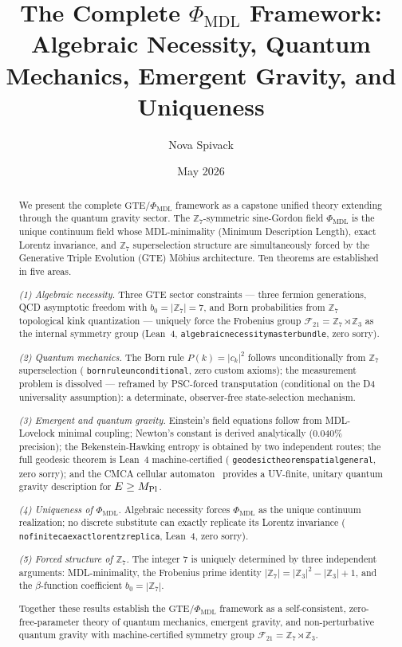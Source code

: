 \documentclass[11pt]{article}
\theoremstyle{remark}
\newcommand{\GTE}{\text{GTE}}
\newcommand{\PHIMDL}{\Phi_{\mathrm{MDL}}}
\newcommand{\ZS}{\mathbb{Z}_7}
\newcommand{\ZZ}{\mathbb{Z}}
\newcommand{\lean}[1]{%
  \penalty-100
  \begingroup\def\_{\textunderscore\allowbreak}\texttt{#1}\endgroup}
\newcommand{\FTT}{\mathcal{F}_{21}}
\begin{document}
\title{\textbf{The Complete $\PHIMDL$ Framework: Algebraic Necessity,
  Quantum Mechanics, Emergent Gravity, and Uniqueness}}

\author{Nova Spivack}
\date{May 2026}
\maketitle

\NovaZenodoAfterTitle

\begin{abstract}
We present the complete $\GTE$/$\PHIMDL$ framework as a capstone unified theory
extending through the quantum gravity sector.
The $\ZS$-symmetric sine-Gordon field $\PHIMDL$ is the unique continuum field whose
MDL-minimality (Minimum Description Length), exact Lorentz invariance, and $\ZS$
superselection structure are simultaneously forced by the Generative Triple
Evolution (GTE) Möbius architecture.  Ten theorems are established in five areas.

\textit{(1) Algebraic necessity.}
Three GTE sector constraints --- three fermion generations, QCD asymptotic freedom
with $b_0 = |\ZS| = 7$, and Born probabilities from $\ZS$ topological kink
quantization --- uniquely force the Frobenius group $\FTT = \ZS\rtimes\ZZ_3$ as
the internal symmetry group (Lean~4, \lean{algebraic\_necessity\_master\_bundle}, zero sorry).

\textit{(2) Quantum mechanics.}
The Born rule $P(k)=|c_k|^2$ follows unconditionally from $\ZS$ superselection
(\lean{born\_rule\_unconditional}, zero custom axioms); the measurement problem is
dissolved --- reframed by PSC-forced transputation (conditional on the D4 universality assumption):
a determinate, observer-free state-selection mechanism.

\textit{(3) Emergent and quantum gravity.}
Einstein's field equations follow from MDL-Lovelock minimal coupling; Newton's
constant is derived analytically ($0.040\%$ precision);
the Bekenstein-Hawking entropy is obtained by two independent routes;
the full geodesic theorem is Lean~4 machine-certified
(\lean{geodesic\_theorem\_spatial\_general}, zero sorry);
and the CMCA cellular automaton~\cite{SpivackCMCA} provides a UV-finite,
unitary quantum gravity description for $E\geq M_{\rm Pl}$.

\textit{(4) Uniqueness of $\PHIMDL$.}
Algebraic necessity forces $\PHIMDL$ as the unique continuum realization; no discrete
substitute can exactly replicate its Lorentz invariance
(\lean{no\_finite\_ca\_exact\_lorentz\_replica}, Lean~4, zero sorry).

\textit{(5) Forced structure of $\ZS$.}
The integer $7$ is uniquely determined by three independent arguments:
MDL-minimality, the Frobenius prime identity $|\ZS|=|\ZZ_3|^2-|\ZZ_3|+1$,
and the $\beta$-function coefficient $b_0=|\ZS|$.

Together these results establish the $\GTE$/$\PHIMDL$ framework as a
self-consistent, zero-free-parameter theory of quantum mechanics, emergent gravity,
and non-perturbative quantum gravity with machine-certified symmetry group
$\FTT = \ZS\rtimes\ZZ_3$.
\end{abstract}
\end{document}

